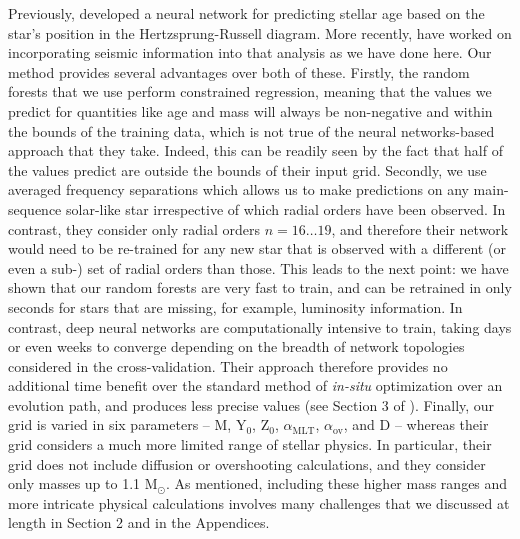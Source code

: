 \documentclass[manuscript]{aastex}
\begin{document}
Previously, \citet{pulone1997age} developed a neural network for predicting stellar age based on the star's position in the Hertzsprung-Russell diagram. More recently, \citet{2016arXiv160200902V} have worked on incorporating seismic information into that analysis as we have done here. Our method provides several advantages over both of these. Firstly, the random forests that we use perform constrained regression, meaning that the values we predict for quantities like age and mass will always be non-negative and within the bounds of the training data, which is not true of the neural networks-based approach that they take. Indeed, this can be readily seen by the fact that half of the values \citet{2016arXiv160200902V} predict are outside the bounds of their input grid. Secondly, we use averaged frequency separations which allows us to make predictions on any main-sequence solar-like star irrespective of which radial orders have been observed. In contrast, they consider only radial orders $n=16\ldots 19$, and therefore their network would need to be re-trained for any new star that is observed with a different (or even a sub-) set of radial orders than those. This leads to the next point: we have shown that our random forests are very fast to train, and can be retrained in only seconds for stars that are missing, for example, luminosity information. In contrast, deep neural networks are computationally intensive to train, taking days or even weeks to converge depending on the breadth of network topologies considered in the cross-validation. Their approach therefore provides no additional time benefit over the standard method of \emph{in-situ} optimization over an evolution path, and produces less precise values (see Section 3 of \citealt{2016arXiv160200902V}). Finally, our grid is varied in six parameters -- M, Y$_0$, Z$_0$, $\alpha_{\text{MLT}}$, $\alpha_{\text{ov}}$, and D -- whereas their grid considers a much more limited range of stellar physics. In particular, their grid does not include diffusion or overshooting calculations, and they consider only masses up to 1.1 M$_\odot$. As mentioned, including these higher mass ranges and more intricate physical calculations involves many challenges that we discussed at length in Section 2 and in the Appendices.
\end{document}
